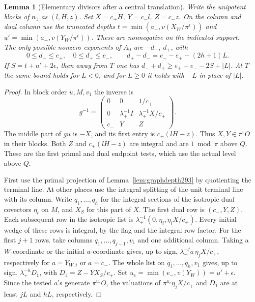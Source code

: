 \documentclass[a4paper,11pt]{article}
\newtheorem{lemma}[proposition]{Lemma}
\theoremstyle{definition}
\theoremstyle{remark}
\numberwithin{equation}{section}
\begin{document}
\begin{lemma}[Elementary divisors after a central translation]\leavevmode
\label{lem:scalardepth294}
Write the unipotent blocks of \(n_1\) as \((l,H,z)\).
Set \(X=c_+ H,\ Y=c_- l,\ Z=c_- z\).
On the column and dual column use the truncated depths
\(t=\min(a_+,v(X_W/\pi^\epsilon))\) and
\(u'=\min(a_-,v(Y_W/\pi^\epsilon))\). These are nonnegative
on the indicated support. The only possible nonzero
exponents of \(A_0\) are \(-d_-\), \(d_+\), with
\[
  0\le d_-\le e_+,\quad 0\le d_+\le e_- ,\qquad
  d_+-d_-=e_--e_+-(2h+1)L .
\]
If \(S=t+u'+2\epsilon\), then away from \(T\) one has
\(d_-+d_+\ge e_++e_--2S+|L|\).
At \(T\) the same bound holds for \(L<0\), and for
\(L\ge0\) it holds with \(-L\) in place of \(|L|\).
\end{lemma}
\begin{proof}
In block order \(u,M,v_1\) the inverse is
\[
  g^{-1}=
  \begin{pmatrix}
    0&0&1/c_+\\
    0&\lambda_+^{-1} I&\lambda_+^{-1}X/c_+\\
    c_-&Y&Z
  \end{pmatrix}.
\]
The middle part of \(gu\) is \(-X\), and its first entry
is \(c_+(lH-z)\). Thus \(X,Y\in\pi^\epsilon O\) in
their blocks. Both \(Z\) and \(c_+(lH-z)\) are integral
and are \(1\bmod\pi\) above \(Q\). These are the first
primal and dual endpoint tests, which use the actual
level above \(Q\).

First use the primal projection of
Lemma~\ref{lem:graphdepth293} by quotienting the terminal
line. At other places use the integral splitting of the
unit terminal line with its column. Write \(q_1,\ldots,q_h\)
for the integral sections of the isotropic dual covectors
\(\eta_i\) on \(M\), and \(X_S\) for this part of \(X\).
The first dual row is \((c_-,Y,Z)\). Each subsequent
row in the isotropic list is
\(\lambda_+^{-1}(0,\eta_i,\eta_i X/c_+)\).
Every initial wedge of these rows is integral, by the
flag and the integral row factor. For the first \(j+1\)
rows, take columns \(q_1,\ldots,q_{j-1},v_1\) and one
additional column. Taking a \(W\)-coordinate or the
initial \(u\)-coordinate gives, up to sign,
\(\lambda_+^{-j}a\,\eta_j X/c_+\), respectively for
\(a=Y_{W,i}\) or \(a=c_-\). The whole list on
\(q_1,\ldots,q_h,v_1\) gives, up to sign,
\(\lambda_+^{-h}D_1\), with \(D_1=Z-YX_S/c_+\).
Set \(u_c=\min(e_-,v(Y_W))=u'+\epsilon\). Since the
tested \(a\)'s generate \(\pi^{u_c}O\), the valuations of
\(\pi^{u_c}\eta_j X/c_+\) and \(D_1\) are at least
\(jL\) and \(hL\), respectively.


\end{proof}
\end{document}

